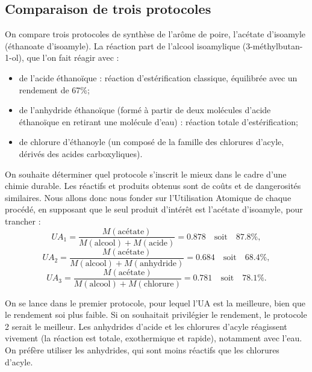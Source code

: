 \documentclass[11pt,a4paper]{report}
\begin{document}
\subsection{Comparaison de trois protocoles}

On compare trois protocoles de synthèse de l'arôme de poire, l'acétate d'isoamyle (éthanoate d'isoamyle). La réaction part de l'alcool isoamylique (3-méthylbutan-1-ol), que l'on fait réagir avec :
\begin{itemize}
	\item de l'acide éthanoïque : réaction d'estérification classique, 
		équilibrée avec un rendement de 67\%;
	\item de l'anhydride éthanoïque (formé à partir de deux molécules d'acide éthanoïque en retirant 			une molécule d'eau) : réaction totale d'estérification;
	\item de chlorure d'éthanoyle (un composé de la famille des chlorures d'acyle, dérivés des acides 			carboxyliques).\\
\end{itemize}

On souhaite déterminer quel protocole s'inscrit le mieux dans le cadre d'une chimie durable. Les réactifs et produits obtenus sont de coûts et de dangerosités similaires. Nous allons donc nous fonder sur l'Utilisation Atomique de chaque procédé, en supposant que le seul produit d'intérêt est l'acétate d'isoamyle, pour trancher :
\begin{equation}
	UA_1 
	= \frac{M(\text{acétate})}{M(\text{alcool}) + M(\text{acide})} 
	= 0.878 \quad\text{soit}\quad 87.8\%,
\end{equation}
\begin{equation}
	UA_2 
	= \frac{M(\text{acétate})}{M(\text{alcool}) + M(\text{anhydride})} 
	= 0.684 \quad\text{soit}\quad 68.4\%,
\end{equation}
\begin{equation}
	UA_3 = \frac{M(\text{acétate})}{M(\text{alcool}) + M(\text{chlorure})} 
	= 0.781 \quad\text{soit}\quad 78.1\%.
\end{equation}

On se lance dans le premier protocole, pour lequel l'UA est la meilleure, bien que le rendement soi plus faible. Si on souhaitait privilégier le rendement, le protocole 2 serait le meilleur. Les anhydrides d'acide et les chlorures d'acyle réagissent vivement (la réaction est totale, exothermique et rapide), notamment avec l'eau. On préfère utiliser les anhydrides, qui sont moins réactifs que les chlorures d'acyle.
\end{document}
